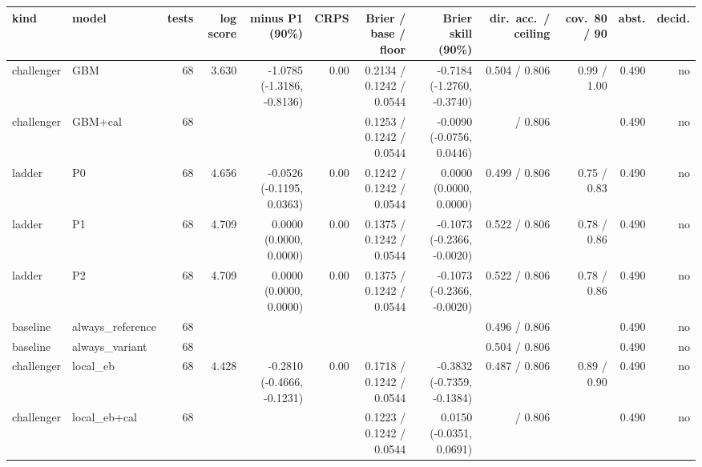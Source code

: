 \begin{tabular}{llrrrrrrrrrr}
\toprule
kind & model & tests & log score & minus P1 (90\%) & CRPS & Brier / base / floor & Brier skill (90\%) & dir.\ acc.\ / ceiling & cov.\ 80 / 90 & abst. & decid. \\
\midrule
challenger & GBM & 68 & 3.630 & -1.0785 (-1.3186, -0.8136) & 0.00 & 0.2134 / 0.1242 / 0.0544 & -0.7184 (-1.2760, -0.3740) & 0.504 / 0.806 & 0.99 / 1.00 & 0.490 & no \\
challenger & GBM+cal & 68 &  &  &  & 0.1253 / 0.1242 / 0.0544 & -0.0090 (-0.0756, 0.0446) &  / 0.806 &  & 0.490 & no \\
ladder & P0 & 68 & 4.656 & -0.0526 (-0.1195, 0.0363) & 0.00 & 0.1242 / 0.1242 / 0.0544 & 0.0000 (0.0000, 0.0000) & 0.499 / 0.806 & 0.75 / 0.83 & 0.490 & no \\
ladder & P1 & 68 & 4.709 & 0.0000 (0.0000, 0.0000) & 0.00 & 0.1375 / 0.1242 / 0.0544 & -0.1073 (-0.2366, -0.0020) & 0.522 / 0.806 & 0.78 / 0.86 & 0.490 & no \\
ladder & P2 & 68 & 4.709 & 0.0000 (0.0000, 0.0000) & 0.00 & 0.1375 / 0.1242 / 0.0544 & -0.1073 (-0.2366, -0.0020) & 0.522 / 0.806 & 0.78 / 0.86 & 0.490 & no \\
baseline & always\_reference & 68 &  &  &  &  &  & 0.496 / 0.806 &  & 0.490 & no \\
baseline & always\_variant & 68 &  &  &  &  &  & 0.504 / 0.806 &  & 0.490 & no \\
challenger & local\_eb & 68 & 4.428 & -0.2810 (-0.4666, -0.1231) & 0.00 & 0.1718 / 0.1242 / 0.0544 & -0.3832 (-0.7359, -0.1384) & 0.487 / 0.806 & 0.89 / 0.90 & 0.490 & no \\
challenger & local\_eb+cal & 68 &  &  &  & 0.1223 / 0.1242 / 0.0544 & 0.0150 (-0.0351, 0.0691) &  / 0.806 &  & 0.490 & no \\
\bottomrule
\end{tabular}
